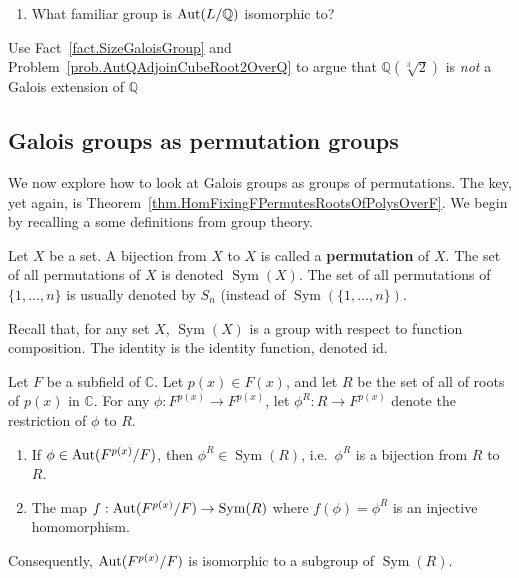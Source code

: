 \begin{problem}
\begin{center}
\end{center}
\begin{enumerate}[resume]
\item What familiar group is $\operatorname{Aut}(L/\mathbb{Q})$ isomorphic to?
\end{enumerate}
\end{problem}

\begin{problem}\label{prob.QAdjoinCubeRoot2OverQNotGalois}
Use Fact~\ref{fact.SizeGaloisGroup} and Problem~\ref{prob.AutQAdjoinCubeRoot2OverQ} to argue that  $\mathbb{Q}(\sqrt[3]{2})$ is \emph{not} a Galois extension of $\mathbb{Q}$ 
\end{problem}

\subsection{Galois groups as permutation groups}
We now explore how to look at Galois groups as groups of permutations. The key, yet again, is Theorem~\ref{thm.HomFixingFPermutesRootsOfPolysOverF}. We begin by recalling a some definitions from group theory.

\begin{definition}
Let $X$ be a set. A bijection from $X$ to $X$ is called a \textbf{permutation} of $X$. The set of all permutations of $X$ is denoted $\operatorname{Sym}(X)$. 
The set of all permutations of $\{1,\ldots,n\}$ is usually denoted by $S_n$ (instead of $\operatorname{Sym}(\{1,\ldots,n\})$.
\end{definition}

Recall that, for any set $X$, $\operatorname{Sym}(X)$ is a group with respect to function composition. The identity is the identity function, denoted id.

\begin{theorem}\label{thm.GaloisGroupIsPermGroup}
Let $F$ be a subfield of $\mathbb{C}$. Let $p(x)\in F(x)$, and let $R$ be the set of all of roots of $p(x)$ in $\mathbb{C}$.  For any $\phi :F^{p(x)} \rightarrow F^{p(x)}$, let $\phi^R: R\rightarrow F^{p(x)}$ denote the restriction of $\phi$ to $R$.
\begin{enumerate} 
\item If $\phi \in \operatorname{Aut}(F^{p(x)}/F)$, then $\phi^R\in \operatorname{Sym}(R)$, i.e.~$\phi^R$ is a bijection from $R$ to $R$.
\item The map $f: \operatorname{Aut}(F^{p(x)}/F)\to \operatorname{Sym}(R)$ where $f(\phi)=\phi^R$  is an injective homomorphism. 
\end{enumerate}
Consequently, $\operatorname{Aut}(F^{p(x)}/F)$ is isomorphic to a subgroup of $\operatorname{Sym}(R)$.
\end{theorem}

